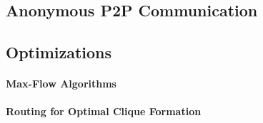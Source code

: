 \subsection{Anonymous P2P Communication}
\subsection{Optimizations}
\paragraph{Max-Flow Algorithms}
\paragraph{Routing for Optimal Clique Formation}
